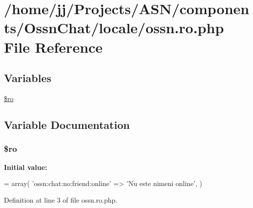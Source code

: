 \hypertarget{components_2_ossn_chat_2locale_2ossn_8ro_8php}{}\section{/home/jj/\+Projects/\+A\+S\+N/components/\+Ossn\+Chat/locale/ossn.ro.\+php File Reference}
\label{components_2_ossn_chat_2locale_2ossn_8ro_8php}
\subsection*{Variables}
\begin{DoxyCompactItemize}
\item 
\hyperlink{components_2_ossn_chat_2locale_2ossn_8ro_8php_ad432e1965f7fa8ce0807b244734e70f8}{\$ro}
\end{DoxyCompactItemize}


\subsection{Variable Documentation}
\subsubsection[{\texorpdfstring{\$ro}{$ro}}]{\setlength{\rightskip}{0pt plus 5cm}\$ro}\hypertarget{components_2_ossn_chat_2locale_2ossn_8ro_8php_ad432e1965f7fa8ce0807b244734e70f8}{}\label{components_2_ossn_chat_2locale_2ossn_8ro_8php_ad432e1965f7fa8ce0807b244734e70f8}
{\bfseries Initial value\+:}
\begin{DoxyCode}
= array(
    \textcolor{stringliteral}{'ossn:chat:no:friend:online'} => \textcolor{stringliteral}{'Nu este nimeni online'},
)
\end{DoxyCode}


Definition at line 3 of file ossn.\+ro.\+php.

